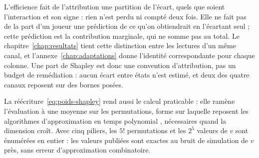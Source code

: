 L'efficience fait de l'attribution une partition de l'écart, quels que soient l'interaction et son
signe : rien n'est perdu ni compté deux fois. Elle ne fait pas de la part d'un joueur une
prédiction de ce qu'on obtiendrait en l'écartant seul ; cette prédiction est la contribution
marginale, qui ne somme pas au total. Le chapitre~\ref{chap:resultats} tient cette distinction
entre les lectures d'un même canal, et l'annexe~\ref{chap:adaptations} donne l'identité correspondante pour
chaque colonne. Une part de Shapley est donc une convention d'attribution, pas un budget de
remédiation : aucun écart entre états n'est estimé, et deux des quatre canaux reposent sur des bornes posées.

La réécriture~\eqref{eq:poids-shapley} rend aussi le calcul praticable : elle ramène l'évaluation à
une moyenne sur les permutations, forme sur laquelle reposent les algorithmes d'approximation en
temps polynomial \citep{CastroGomezTejada2009, SongNelsonStaum2016}, nécessaires quand la dimension
croît. Avec cinq piliers, les $5!$ permutations et les $2^5$ valeurs de $v$ sont énumérées en
entier : les valeurs publiées sont exactes au bruit de simulation de $v$ près, sans erreur
d'approximation combinatoire.
